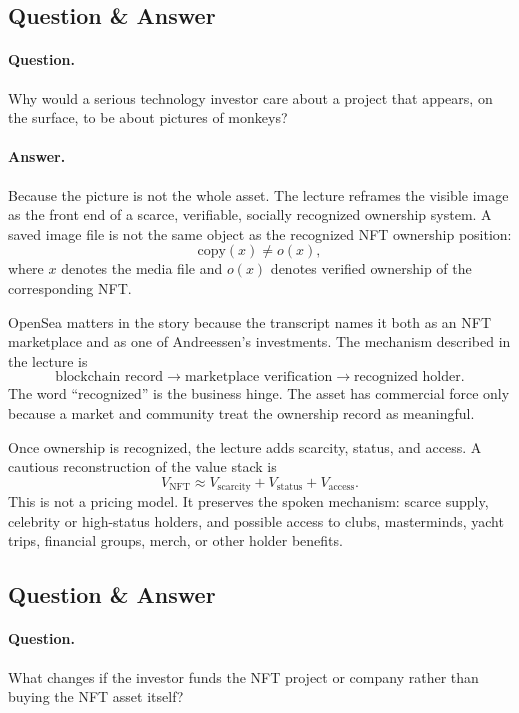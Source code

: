 \documentclass[11pt,oneside]{book}
\begin{document}
\subsection{Question \& Answer}

\paragraph{Question.}
Why would a serious technology investor care about a project that appears, on the surface, to be about pictures of monkeys?

\paragraph{Answer.}
Because the picture is not the whole asset. The lecture reframes the visible image as the front end of a scarce, verifiable, socially recognized ownership system. A saved image file is not the same object as the recognized NFT ownership position:
\[
\text{copy}(x)\neq o(x),
\]
where \(x\) denotes the media file and \(o(x)\) denotes verified ownership of the corresponding NFT.

OpenSea matters in the story because the transcript names it both as an NFT marketplace and as one of Andreessen's investments. The mechanism described in the lecture is
\[
\text{blockchain record}
\longrightarrow
\text{marketplace verification}
\longrightarrow
\text{recognized holder}.
\]
The word ``recognized'' is the business hinge. The asset has commercial force only because a market and community treat the ownership record as meaningful.

Once ownership is recognized, the lecture adds scarcity, status, and access. A cautious reconstruction of the value stack is
\[
V_{\mathrm{NFT}}
\approx
V_{\mathrm{scarcity}}
+
V_{\mathrm{status}}
+
V_{\mathrm{access}}.
\]
This is not a pricing model. It preserves the spoken mechanism: scarce supply, celebrity or high-status holders, and possible access to clubs, masterminds, yacht trips, financial groups, merch, or other holder benefits.

\subsection{Question \& Answer}

\paragraph{Question.}
What changes if the investor funds the NFT project or company rather than buying the NFT asset itself?
\end{document}
